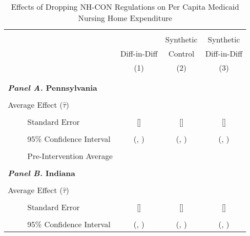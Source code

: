 \documentclass[../Main.tex]{subfiles}
\begin{document}
\newpage
\null
\vfill
\begin{table}[htbp]\centering \footnotesize
\def\sym#1{\ifmmode^{#1}\else\(^{#1}\)\fi}
\captionsetup{width=.69\textwidth}
\caption{\centering Effects of Dropping NH-CON Regulations on Per Capita Medicaid Nursing Home Expenditure}
\label{tab:ave_results_med_exp}
\setlength{\tabcolsep}{10pt}
\begin{tabular}{l*{3}{c}}
\hline\hline
\\[-2ex]
&\multicolumn{1}{c}{}&\multicolumn{1}{c}{Synthetic}&\multicolumn{1}{c}{Synthetic}\\
&\multicolumn{1}{c}{Diff-in-Diff}&\multicolumn{1}{c}{Control}&\multicolumn{1}{c}{Diff-in-Diff}\\
&\multicolumn{1}{c}{(1)}&\multicolumn{1}{c}{(2)}&\multicolumn{1}{c}{(3)}\\
\\[-2ex]
\hline
\\[-.1ex]
\multicolumn{4}{l}{\textbf{\textit{Panel A.} Pennsylvania}}\\
\\[-1.5ex]
\multicolumn{1}{l}{Average Effect ($\hat{\tau}$)}&   \multicolumn{1}{c}{}&   \multicolumn{1}{c}{}&  \multicolumn{1}{c}{}\\
\\[-2ex]
\multicolumn{1}{l}{\ \ \ \ \ Standard Error}  &\multicolumn{1}{c}{[]}&\multicolumn{1}{c}{[]}&\multicolumn{1}{c}{[]}\\
\\[-2ex]
\multicolumn{1}{l}{\ \ \ \ \ 95\% Confidence Interval}&   \multicolumn{1}{c}{(, )}&   \multicolumn{1}{c}{(, )}&   \multicolumn{1}{c}{(, )}\\
\\[-2ex]
\multicolumn{1}{l}{\ \ \ \ \ Pre-Intervention Average}&   \multicolumn{3}{c}{}\\
\\[-.1ex]
\multicolumn{4}{l}{\textbf{\textit{Panel B.} Indiana}}\\
\\[-1.5ex]
\multicolumn{1}{l}{Average Effect ($\hat{\tau}$)}&   \multicolumn{1}{c}{}&   \multicolumn{1}{c}{}&  \multicolumn{1}{c}{}\\
\\[-2ex]
\multicolumn{1}{l}{\ \ \ \ \ Standard Error}  &\multicolumn{1}{c}{[]}&\multicolumn{1}{c}{[]}&\multicolumn{1}{c}{[]}\\
\\[-2ex]
\multicolumn{1}{l}{\ \ \ \ \ 95\% Confidence Interval}&   \multicolumn{1}{c}{(, )}&   \multicolumn{1}{c}{(, )}&   \multicolumn{1}{c}{(, )}\\

\end{tabular}
\end{table}
\end{document}
